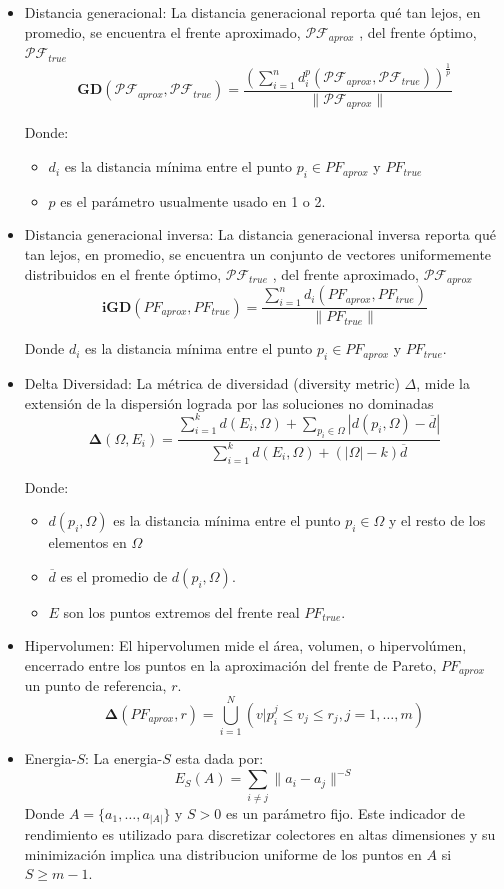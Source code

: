 \documentclass[letterpaper,10pt]{article}
\begin{document}
\begin{itemize}
 \item Distancia generacional: La distancia generacional reporta qué tan lejos, en promedio, se encuentra el frente aproximado, $\mathcal{PF}_{aprox}$ , del frente óptimo, $\mathcal{PF}_{true}$
 $$\bm{GD}(\mathcal{PF}_{aprox},\mathcal{PF}_{true})=\frac{(\sum^n_{i=1} d_i^p(\mathcal{PF}_{aprox},\mathcal{PF}_{true}))^{\frac{1}{p}}}{\|\mathcal{PF}_{aprox}\|}$$
 
 Donde:
 \begin{itemize}
  \item $d_i$ es la distancia mínima entre el punto $p_i \in PF_{aprox}$ y $PF_{true}$  
  \item $p$ es el parámetro usualmente usado en 1 o 2.
 \end{itemize}
 
 
 \item Distancia generacional inversa: La distancia generacional inversa reporta qué tan lejos, en promedio, se encuentra un conjunto de vectores uniformemente distribuidos en el frente óptimo, $\mathcal{PF}_{true}$ , del frente aproximado, $\mathcal{PF}_{aprox}$
 $$\bm{iGD}(PF_{aprox},PF_{true})=\frac{\sum^n_{i=1} d_i(PF_{aprox},PF_{true})}{\|PF_{true}\|}$$
 
Donde $d_i$ es la distancia mínima entre el punto $p_i \in PF_{aprox}$ y $PF_{true}$.


 \item Delta Diversidad: La métrica de diversidad (diversity metric) $\Delta$, mide la extensión de la dispersión lograda por las soluciones no dominadas
 $$\bm{\Delta}(\Omega,E_i)=\frac{\sum^k_{i=1} d(E_i,\Omega) + \sum_{p_i \in \Omega} |d(p_i,\Omega)-\overline{d}|}{\sum^k_{i=1} d(E_i,\Omega) + (|\Omega| - k)\overline{d}}$$
 
 Donde:
 \begin{itemize}
  \item $d(p_i,\Omega)$ es la distancia mínima entre el punto $p_i \in \Omega$ y el resto de los elementos en $\Omega$  
  \item $\overline{d}$ es el promedio de $d(p_i,\Omega)$.
  \item $E$ son los puntos extremos del frente real $PF_{true}$.
 \end{itemize}

 \item Hipervolumen: El hipervolumen mide el área, volumen, o hipervolúmen, encerrado entre los puntos en la aproximación del frente de Pareto, $PF_{aprox}$
un punto de referencia, $r$.
 $$\bm{\Delta}(PF_{aprox},r)=\bigcup^N_{i=1} (v|p^j_i \leq v_j \leq r_j , j = 1, \dots, m) $$
 
 \item Energia-$S$: La energia-$S$ esta dada por:
 $$E_S(A)= \sum_{i\neq j}\| a_i - a_j\|^{-S}$$
 Donde $A = \{ a_1, \dots, a_{|A|}\}$ y $S>0$ es un parámetro fijo. Este indicador de rendimiento es utilizado para discretizar colectores en altas dimensiones y
 su minimización implica una distribucion uniforme de los puntos en $A$ si $S\geq m-1$\cite{hardin2004discretizing}.
\end{itemize}
\end{document}
